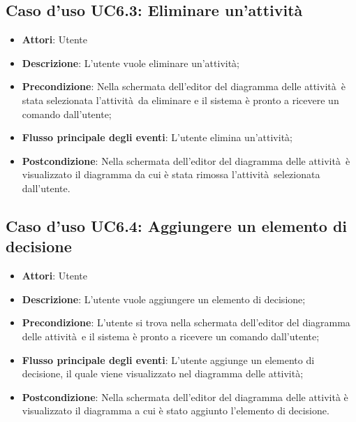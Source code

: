 \documentclass[../AnalisiDeiRequisiti.tex]{subfiles}
\begin{document}
				\subsection{Caso d'uso UC6.3: Eliminare un'attività}
				\begin{itemize}
					\item \textbf{Attori}: Utente
					\item \textbf{Descrizione}: L'utente vuole eliminare un'attività;
					\item \textbf{Precondizione}: Nella schermata dell'editor del diagramma delle attività è stata selezionata l'attività da eliminare e il sistema è pronto a ricevere un comando dall'utente;
					\item \textbf{Flusso principale degli eventi}: L'utente elimina un'attività;
					\item \textbf{Postcondizione}: Nella schermata dell'editor del diagramma delle attività è visualizzato il diagramma da cui è stata rimossa l'attività selezionata dall'utente.
				\end{itemize}
				\subsection{Caso d'uso UC6.4: Aggiungere un elemento di decisione}
				\begin{itemize}
					\item \textbf{Attori}: Utente
					\item \textbf{Descrizione}: L'utente vuole aggiungere un elemento di decisione;
					\item \textbf{Precondizione}: L'utente si trova nella schermata dell'editor del diagramma delle attività e il sistema è pronto a ricevere un comando dall'utente;
					\item \textbf{Flusso principale degli eventi}: L'utente aggiunge un elemento di decisione, il quale viene visualizzato nel diagramma delle attività;
					\item \textbf{Postcondizione}: Nella schermata dell'editor del diagramma delle attività è visualizzato il diagramma a cui è stato aggiunto l'elemento di decisione.
				\end{itemize}
\end{document}
